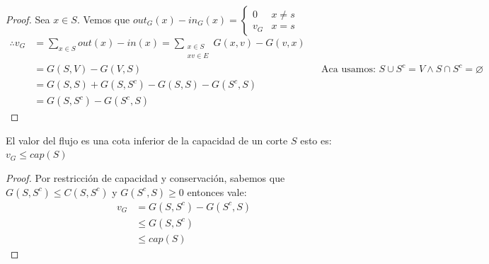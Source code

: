 \begin{proof}
Sea $x\in S$. Vemos que $out_G(x) - in_G(x) = \left\{
    \begin{array}{cc}
     0  &x\neq s\\
     v_G &x = s
    \end{array}
\right.$\\

\begin{align}
    \therefore v_G &= \sum_{x\in S} out(x) - in(x) = \sum_{\substack{x\in S\\xv \in E}} G(x,v) - G(v,x)\\
    &= G(S,V) - G(V,S)  &&\text{Aca usamos: } S \cup S^c = V \wedge S \cap S^c = \varnothing \\
    &= G(S,S) + G(S, S^c) - G(S,S) - G(S^c, S)\\
    &= G(S,S^c) - G(S^c, S)
\end{align}

\end{proof}

\begin{corollary}
El valor del flujo es una cota inferior de la capacidad de un corte $S$ esto es: $v_G \le cap(S)$
\end{corollary}
\begin{proof}
Por restricción de capacidad y conservación, sabemos que \\$G(S, S^c) \le C(S, S^c)$ y $G(S^c, S) \ge 0$ entonces vale:
\begin{align}
v_G &= G(S, S^c) - G(S^c, S)\\
	&\le G(S, S^c)\\
    &\le cap(S)
\end{align}
\end{proof}


